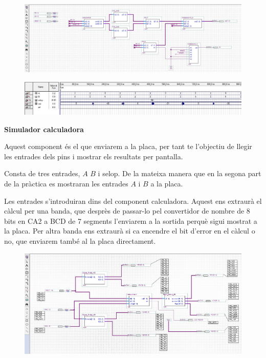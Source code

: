 \documentclass[12pt, a4papre]{article}
\begin{document}
	\begin{center}
	\begin{figure}[H]
		\begin{center}
		\includegraphics[width=150mm]{calculadora.jpeg}
		\end{center}
	\end{figure}
	\end{center}
		\begin{center}
	\begin{figure}[H]
		\begin{center}
		\includegraphics[width=150mm]{simuladoracalculadora.jpeg}
		\end{center}
	\end{figure}
	\end{center}
	
	\textbf{\large{Simulador calculadora}}
	
	Aquest component és el que enviarem a la placa, per tant te l'objectiu de llegir les entrades dels pins i mostrar els resultats per pantalla.

	Consta de tres entrades, $A$ $B$ i selop. De la mateixa manera que en la segona part de la pràctica es mostraran les entrades $A$ i $B$ a la placa.

	Les entrades s'introduiran dins del component calculadora. Aquest ens extraurà el càlcul per una banda, que desprès de passar-lo pel convertidor de nombre de 8 bits en CA2 a BCD de 7 segments l'enviarem a la sortida perquè sigui mostrat a la placa. Per altra banda ens extraurà si ca encendre el bit d'error en el càlcul o no, que enviarem també al la placa directament.
	
	\begin{center}
	\begin{figure}[H]
		\begin{center}
		\includegraphics[width=150mm]{simuladorcalc.jpeg}
		\end{center}
	\end{figure}
	\end{center}
	
	
	
	
\end{document}
